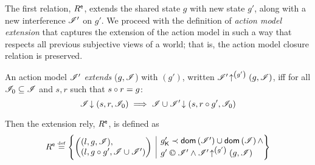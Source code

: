 The first relation, $R^{\textsf{e}}$, extends the shared state $g$ with new state $g'$, along with a new interference $\mathscr{I}'$ on $g'$. We proceed with the definition of \emph{action model extension} that captures the extension of the action model in such a way that respects all previous subjective views of a world; that is, the action model closure relation is preserved.
%
%
\begin{definition}\label{def:amodExtension}
An action model $\mathscr{I}'$ \emph{extends} ($g, \mathscr{I}$) with
$(g')$, written
$\mathscr{I}' \!\uparrow^{\left(g'\right)} \left(g, \mathscr{I}\right)$, iff for all
$\mathscr{I}_0 \subseteq \mathscr{I}$ and $s, r$ such that $s \circ r = g$:
\[
\mathscr{I} \!\downarrow \left(s, r, \mathscr{I}_0\right) \implies \mathscr{I} \cup \mathscr{I}' \!\downarrow \left(s, r\circ g', \mathscr{I}_0\right)
\]
\end{definition}
%
%
Then the extension rely, $R^{\textsf{e}}$, is defined as
%
\[
  \extendR \eqdef
  \left\{
  \begin{array}{@{} l @{\hspace{5pt}} | @{\hspace{5pt}} l @{}}
    \left(
    \begin{array}{@{} l @{}}
      (l , g, \lmod),\\
      (l, g \composeL g', \lmod \cup \lmod')
    \end{array}
    \right)
    &
    \begin{array}{@{} l @{}}
      \capPart{g'} \containedIn \dom{\lmod'} \cup \dom{\lmod} \land \\
      	g' \containI \lmod' \land
      \expandsAM{\lmod'}{g'}{g}{\lmod}
    \end{array}
  \end{array}
  \right\}
\]


